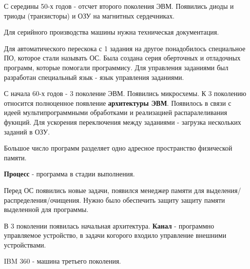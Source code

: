 \documentclass[a4paper, 14pt]{report}
\begin{document}
    С середины 50-х годов - отсчет второго поколения ЭВМ. Появились диоды и триоды (транзисторы) и ОЗУ на магнитных сердечниках.

    Для серийного производства машины нужна техническая документация.


    Для автоматического перескока с 1 задания на другое понадобилось специальное ПО, которое стали называть ОС. Была создана серия оберточных и отладочных программ, которые помогали программису. Для управления заданиями был разработан специальный язык - язык управления заданиями.

    С начала 60-х годов - 3 поколение ЭВМ. Появились микросхемы. К 3 поколению относится полноценное появление \textbf{архитектуры ЭВМ}. Появилось в связи с идеей мультипрограммными обработками и реализацией распаралеливания фукнций. Для ускорения переключения между заданиями - загрузка нескольких заданий в ОЗУ.

    Большое число программ разделяет одно адресное пространство физической памяти.

    \textbf{Процесс} - программа в стадии выполнения.

    Перед ОС появились новые задачи, появился менеджер памяти для выделения/распределения/очищения. Нужно было обеспечить защиту защиту памяти выделенной для программы.

    В 3 поколении появилась начальная архитектура. \textbf{Канал} - программно управляемое устройство, в задачи когорого входило управление внешними устройствами.

    IBM 360 - машина третьего поколения.

    \hfill

\end{document}
